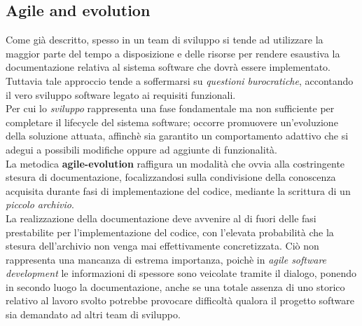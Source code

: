 \documentclass{article}
\begin{document}
\subsection*{Agile and evolution}
\large
Come già descritto, spesso in un team di sviluppo si tende ad utilizzare la maggior parte del tempo a disposizione e delle risorse per rendere esaustiva la documentazione relativa al sistema software che dovrà essere implementato. Tuttavia tale approccio tende a soffermarsi su \textit{questioni burocratiche}, accontando il vero sviluppo software legato ai requisiti funzionali.\vspace*{14pt}\\
Per cui lo \textit{sviluppo} rappresenta una fase fondamentale ma non sufficiente per completare il lifecycle del sistema software; occorre promuovere un'evoluzione della soluzione attuata, affinchè sia garantito un comportamento adattivo che si adegui a possibili modifiche oppure ad aggiunte di funzionalità.\vspace*{14pt}\\
La metodica \textbf{agile-evolution} raffigura un modalità che ovvia alla costringente stesura di documentazione, focalizzandosi sulla condivisione della conoscenza acquisita durante fasi di implementazione del codice, mediante la scrittura di un \textit{piccolo archivio}.\vspace*{14pt}\\
La realizzazione della documentazione deve avvenire al di fuori delle fasi prestabilite per l'implementazione del codice, con l'elevata probabilità che la stesura dell'archivio non venga mai effettivamente concretizzata. Ciò non rappresenta una mancanza di estrema importanza, poichè in \textit{agile software development} le informazioni di spessore sono veicolate tramite il dialogo, ponendo in secondo luogo la documentazione, anche se una totale assenza di uno storico relativo al lavoro svolto potrebbe provocare difficoltà qualora il progetto software sia demandato ad altri team di sviluppo.
\end{document}
